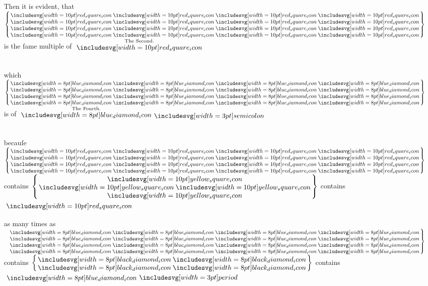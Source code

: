 \documentclass[12pt,preview]{standalone}
\begin{document}
\newpage

\begin{minipage}{\textwidth}
    \begin{center}
        Then it is evident, that $\left\{\hspace{-1.5ex}\begin{array}{c} \redsquares \\ \redsquares \\ \redsquares \\ \redsquares \end{array}\hspace{-1.5ex}\right\}$ is the ſame multiple of $\overset{\text{\scriptsize The Second.}}{\redsquare}$\\
        \hfill\\
        \hfill\\
        which $\left\{\hspace{-1.5ex}\begin{array}{c} \bluediamonds \\ \bluediamonds \\ \bluediamonds \\ \bluediamonds \end{array}\hspace{-1.5ex}\right\}$ is of $\overset{\text{\scriptsize The Fourth.}}{\bluediamond} \bsemicolon$\\
        \hfill\\
        \hfill\\
        becauſe $\left\{\hspace{-1.5ex}\begin{array}{c} \redsquares \\ \redsquares \\ \redsquares \\ \redsquares \end{array}\hspace{-1.5ex}\right\}$ contains $\left\{\hspace{-1.5ex}\begin{array}{c} \yellowsquare \\ \yellowsquares \\ \yellowsquare \end{array}\hspace{-1.5ex}\right\}$ contains $\redsquare$\\
        \hfill\\
        as many times as\\
        $\left.\begin{array}{c} \bluediamonds \\ \bluediamonds \\ \bluediamonds \\ \bluediamonds \end{array}\hspace{-1.5ex}\right\}$ contains $\left\{\hspace{-1.5ex}\begin{array}{c} \blackdiamonds \\ \blackdiamonds \end{array}\hspace{-1.5ex}\right\}$ contains $\bluediamond \bperiod$
    \end{center}


\end{minipage}
\end{document}
